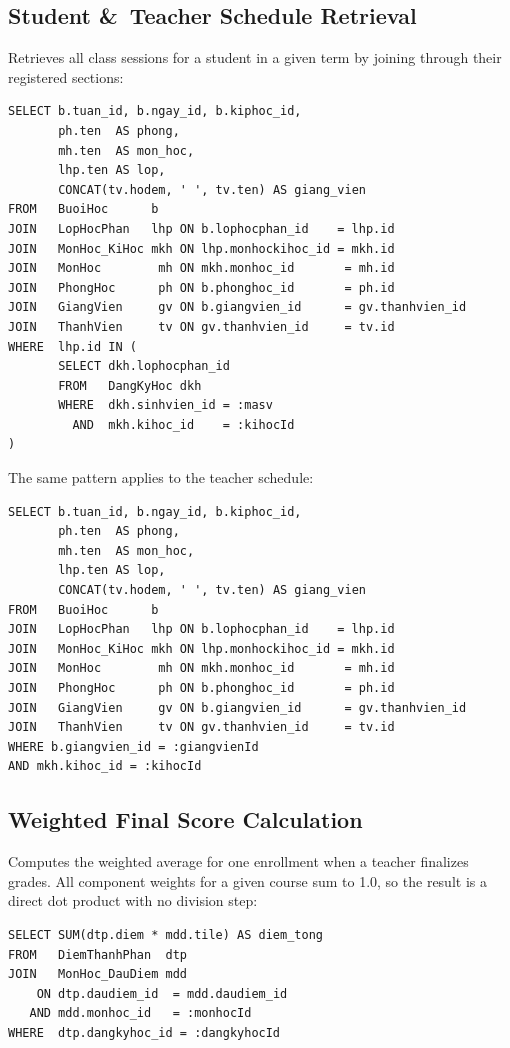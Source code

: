 \documentclass[12pt,a4paper]{report}
\begin{document}
\subsection{Student \&\ Teacher Schedule Retrieval}

Retrieves all class sessions for a student in a given term by joining through their registered sections:

\begin{verbatim}
SELECT b.tuan_id, b.ngay_id, b.kiphoc_id,
       ph.ten  AS phong,
       mh.ten  AS mon_hoc,
       lhp.ten AS lop,
       CONCAT(tv.hodem, ' ', tv.ten) AS giang_vien
FROM   BuoiHoc      b
JOIN   LopHocPhan   lhp ON b.lophocphan_id    = lhp.id
JOIN   MonHoc_KiHoc mkh ON lhp.monhockihoc_id = mkh.id
JOIN   MonHoc        mh ON mkh.monhoc_id       = mh.id
JOIN   PhongHoc      ph ON b.phonghoc_id       = ph.id
JOIN   GiangVien     gv ON b.giangvien_id      = gv.thanhvien_id
JOIN   ThanhVien     tv ON gv.thanhvien_id     = tv.id
WHERE  lhp.id IN (
       SELECT dkh.lophocphan_id
       FROM   DangKyHoc dkh
       WHERE  dkh.sinhvien_id = :masv
         AND  mkh.kihoc_id    = :kihocId
)
\end{verbatim}

The same pattern applies to the teacher schedule: 
\begin{verbatim}
SELECT b.tuan_id, b.ngay_id, b.kiphoc_id,
       ph.ten  AS phong,
       mh.ten  AS mon_hoc,
       lhp.ten AS lop,
       CONCAT(tv.hodem, ' ', tv.ten) AS giang_vien
FROM   BuoiHoc      b
JOIN   LopHocPhan   lhp ON b.lophocphan_id    = lhp.id
JOIN   MonHoc_KiHoc mkh ON lhp.monhockihoc_id = mkh.id
JOIN   MonHoc        mh ON mkh.monhoc_id       = mh.id
JOIN   PhongHoc      ph ON b.phonghoc_id       = ph.id
JOIN   GiangVien     gv ON b.giangvien_id      = gv.thanhvien_id
JOIN   ThanhVien     tv ON gv.thanhvien_id     = tv.id
WHERE b.giangvien_id = :giangvienId
AND mkh.kihoc_id = :kihocId
\end{verbatim}

\subsection{Weighted Final Score Calculation}

Computes the weighted average for one enrollment when a teacher finalizes grades. All component weights for a given course sum to 1.0, so the result is a direct dot product with no division step:

\begin{verbatim}
SELECT SUM(dtp.diem * mdd.tile) AS diem_tong
FROM   DiemThanhPhan  dtp
JOIN   MonHoc_DauDiem mdd
    ON dtp.daudiem_id  = mdd.daudiem_id
   AND mdd.monhoc_id   = :monhocId
WHERE  dtp.dangkyhoc_id = :dangkyhocId
\end{verbatim}
\end{document}
